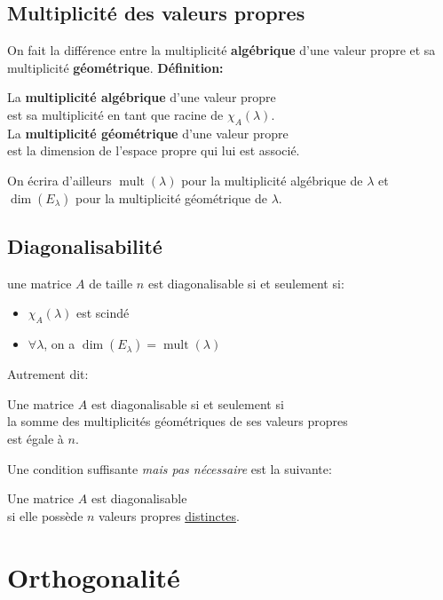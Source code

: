 \documentclass{article}
\numberwithin{equation}{section}
\newcommand\thm[1]{\vspace{4px}\noindent \quad {\large \underline{\textsc{Théorème #1}}: }}
\DeclareMathOperator{\mult}{mult}
\begin{document}
\subsection{Multiplicité des valeurs propres}
On fait la différence entre la multiplicité \textbf{algébrique} d'une valeur propre et sa multiplicité \textbf{géométrique}.
\textbf{Définition:}
\begin{center}
	La \textbf{multiplicité algébrique} d'une valeur propre \\ est sa multiplicité en tant que racine de \(\chi_A(\lambda)\). \\ \vspace{10pt}
	La \textbf{multiplicité géométrique} d'une valeur propre \\ est la dimension de l'espace propre qui lui est associé.
\end{center}
On écrira d'ailleurs \(\mult(\lambda)\) pour la multiplicité algébrique de \(\lambda\) et \(\dim(E_\lambda)\) pour la multiplicité géométrique de \(\lambda\).

\subsection{Diagonalisabilité}
\thm{} une matrice $A$ de taille $n$ est diagonalisable si et seulement si:
\begin{itemize}
	\item \(\chi_A(\lambda)\) est scindé
	\item \(\forall \lambda\), on a \(\dim(E_\lambda) = \mult(\lambda)\)
\end{itemize}
Autrement dit:
\begin{center}
	Une matrice \(A\) est diagonalisable si et seulement si \\ la somme des multiplicités géométriques de ses valeurs propres \\ est égale à \(n\).
\end{center}
Une condition suffisante \emph{mais pas nécessaire} est la suivante:
\begin{center}
	Une matrice \(A\) est diagonalisable \\ si elle possède \(n\) valeurs propres \underline{distinctes}.
\end{center}


\section{Orthogonalité}
\end{document}
